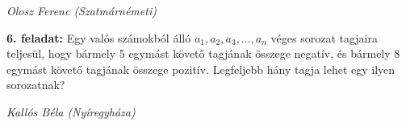 \documentclass[a4paper,10pt]{article}
\def\ki#1#2{\hfill {\it #1 (#2)}\medskip}
\begin{document}
\ki{Olosz Ferenc}{Szatmárnémeti}\medskip

{\bf 6. feladat: } Egy valós számokból álló $a_1, a_2, a_3,\dots, a_n$ véges sorozat tagjaira teljesül, hogy bármely 5 egymást
követő tagjának összege negatív, és bármely 8 egymást követő tagjának összege pozitív. Legfeljebb
hány tagja lehet egy ilyen sorozatnak?


\ki{Kallós Béla}{Nyíregyháza}\medskip

\vfill
\end{document}

